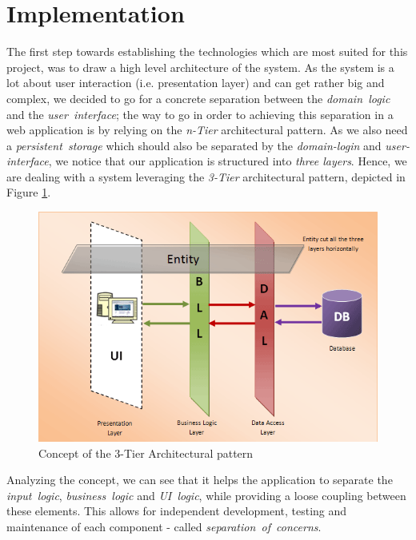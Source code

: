 \section{Implementation}
\label{sec.implementation}
\noindent The first step towards establishing the technologies which are most
suited for this project, was to draw a high level architecture of the system. As
the system is a lot about user interaction (i.e. presentation layer) and can get
rather big and complex, we decided to go for a concrete separation between the
\emph{domain~logic} and the \emph{user~interface}; the way to go in order to
achieving this separation in a web application is by relying on the
\emph{n-Tier} architectural pattern. As we also need a \emph{persistent~storage}
which should also be separated by the \emph{domain-login} and
\emph{user-interface}, we notice that our application is structured into
\emph{three layers}. Hence, we are dealing with a system leveraging the
\emph{3-Tier} architectural pattern, depicted in Figure \ref{fig.setup}.
\begin{figure}[H] 
	\centering
	\includegraphics[width=\linewidth]{fig/3tier2}
	\caption{Concept of the 3-Tier Architectural pattern}
	\label{fig.setup}
\end{figure}
\noindent Analyzing the concept, we can see that it helps the application to
separate the \emph{input~logic}, \emph{business~logic} and \emph{UI~logic},
while providing a loose coupling between these elements. This allows for
independent development, testing and maintenance of each component - called
\emph{separation~of~concerns}.\\

